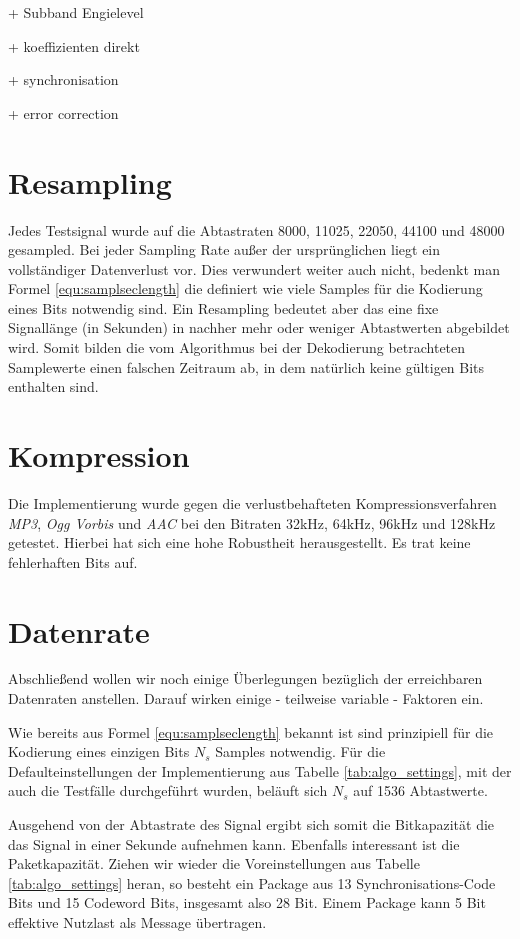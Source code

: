 + Subband Engielevel

+ koeffizienten direkt

+ synchronisation

+ error correction

\section{Resampling}

Jedes Testsignal wurde auf die Abtastraten 8000, 11025, 22050, 44100 und 48000 gesampled. Bei jeder Sampling Rate außer der ursprünglichen liegt ein vollständiger Datenverlust vor. Dies verwundert weiter auch nicht, bedenkt man Formel \ref{equ:samplseclength} die definiert wie viele Samples für die Kodierung eines Bits notwendig sind. Ein Resampling bedeutet aber das eine fixe Signallänge (in Sekunden) in nachher mehr oder weniger Abtastwerten abgebildet wird. Somit bilden die vom Algorithmus bei der Dekodierung betrachteten Samplewerte einen falschen Zeitraum ab, in dem natürlich keine gültigen Bits enthalten sind. 

\section{Kompression}

Die Implementierung wurde gegen die verlustbehafteten Kompressionsverfahren \textit{MP3}, \textit{Ogg Vorbis} und \textit{AAC} bei den Bitraten 32kHz, 64kHz, 96kHz und 128kHz getestet. Hierbei hat sich eine hohe Robustheit herausgestellt. Es trat keine fehlerhaften Bits auf.  

\section{Datenrate}
\label{sec:datenrate}

Abschließend wollen wir noch einige Überlegungen bezüglich der erreichbaren Datenraten anstellen. Darauf wirken einige - teilweise variable - Faktoren ein.  

Wie bereits aus Formel \ref{equ:samplseclength} bekannt ist sind prinzipiell für die Kodierung eines einzigen Bits $N_s$ Samples notwendig. Für die Defaulteinstellungen der Implementierung aus Tabelle \ref{tab:algo_settings}, mit der auch die Testfälle durchgeführt wurden, beläuft sich $N_s$ auf 1536 Abtastwerte. 

Ausgehend von der Abtastrate des Signal ergibt sich somit die Bitkapazität die das Signal in einer Sekunde aufnehmen kann. Ebenfalls interessant ist die Paketkapazität. Ziehen wir wieder die Voreinstellungen aus Tabelle \ref{tab:algo_settings} heran, so besteht ein Package aus 13 Synchronisations-Code Bits und 15 Codeword Bits, insgesamt also 28 Bit. Einem Package kann 5 Bit effektive Nutzlast als Message übertragen. 

